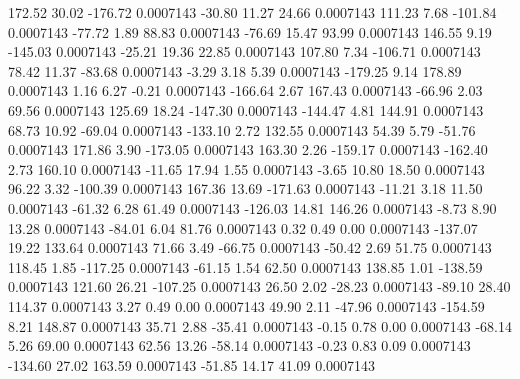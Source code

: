       172.52       30.02     -176.72     0.0007143
      -30.80       11.27       24.66     0.0007143
      111.23        7.68     -101.84     0.0007143
      -77.72        1.89       88.83     0.0007143
      -76.69       15.47       93.99     0.0007143
      146.55        9.19     -145.03     0.0007143
      -25.21       19.36       22.85     0.0007143
      107.80        7.34     -106.71     0.0007143
       78.42       11.37      -83.68     0.0007143
       -3.29        3.18        5.39     0.0007143
     -179.25        9.14      178.89     0.0007143
        1.16        6.27       -0.21     0.0007143
     -166.64        2.67      167.43     0.0007143
      -66.96        2.03       69.56     0.0007143
      125.69       18.24     -147.30     0.0007143
     -144.47        4.81      144.91     0.0007143
       68.73       10.92      -69.04     0.0007143
     -133.10        2.72      132.55     0.0007143
       54.39        5.79      -51.76     0.0007143
      171.86        3.90     -173.05     0.0007143
      163.30        2.26     -159.17     0.0007143
     -162.40        2.73      160.10     0.0007143
      -11.65       17.94        1.55     0.0007143
       -3.65       10.80       18.50     0.0007143
       96.22        3.32     -100.39     0.0007143
      167.36       13.69     -171.63     0.0007143
      -11.21        3.18       11.50     0.0007143
      -61.32        6.28       61.49     0.0007143
     -126.03       14.81      146.26     0.0007143
       -8.73        8.90       13.28     0.0007143
      -84.01        6.04       81.76     0.0007143
        0.32        0.49        0.00     0.0007143
     -137.07       19.22      133.64     0.0007143
       71.66        3.49      -66.75     0.0007143
      -50.42        2.69       51.75     0.0007143
      118.45        1.85     -117.25     0.0007143
      -61.15        1.54       62.50     0.0007143
      138.85        1.01     -138.59     0.0007143
      121.60       26.21     -107.25     0.0007143
       26.50        2.02      -28.23     0.0007143
      -89.10       28.40      114.37     0.0007143
        3.27        0.49        0.00     0.0007143
       49.90        2.11      -47.96     0.0007143
     -154.59        8.21      148.87     0.0007143
       35.71        2.88      -35.41     0.0007143
       -0.15        0.78        0.00     0.0007143
      -68.14        5.26       69.00     0.0007143
       62.56       13.26      -58.14     0.0007143
       -0.23        0.83        0.09     0.0007143
     -134.60       27.02      163.59     0.0007143
      -51.85       14.17       41.09     0.0007143
